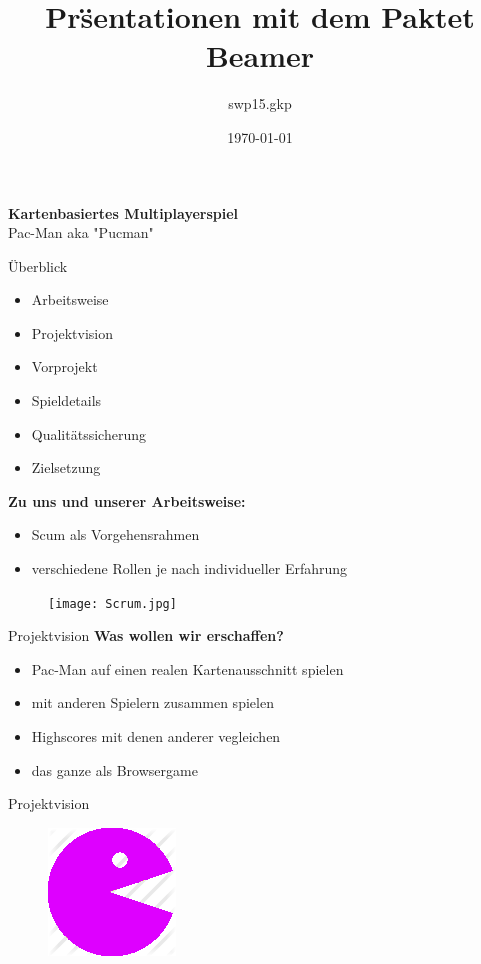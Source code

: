 \documentclass{beamer}
\title[SWT-Praktikum]{Pr\"sentationen mit dem Paktet  Beamer}
\author{swp15.gkp}
\date{\today{}}
\begin{document}
\begin{frame}
\center \huge \textbf{Kartenbasiertes Multiplayerspiel} \\
Pac-Man aka "Pucman"
\end{frame}
\begin{frame}{Überblick}
\begin{itemize}
\item Arbeitsweise
\item Projektvision
\item Vorprojekt
\item Spieldetails
\item Qualitätssicherung
\item Zielsetzung
\end{itemize}
\end{frame}
\begin{frame}
\textbf{Zu uns und unserer Arbeitsweise:}
\begin{itemize}
\item Scum als Vorgehensrahmen
\item verschiedene Rollen je nach individueller Erfahrung
\end{itemize}
\begin{figure}[htb]
  \centering
  \texttt{[image: Scrum.jpg]}
  \label{PNFs}
\end{figure} 
\end{frame}
\begin{frame}{Projektvision}
\textbf{Was wollen wir erschaffen?}
\begin{itemize}
\item Pac-Man auf einen realen Kartenausschnitt
spielen
\item mit anderen Spielern zusammen spielen
\item Highscores mit denen anderer
vegleichen
\item das ganze als Browsergame
\end{itemize}
\end{frame}
\begin{frame}{Projektvision}
\begin{figure}[htb]
  \centering
  \includegraphics[scale=0.3]{pacman.png}
  \label{PNFs}
\end{figure} 
\end{frame}
\end{document}
